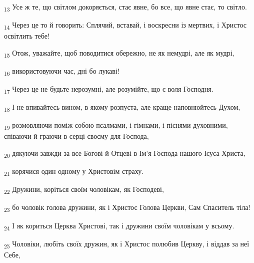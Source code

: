 \begin{tcolorbox}
\textsubscript{13} Усе ж те, що світлом докоряється, стає явне, бо все, що явне стає, то світло.
\end{tcolorbox}
\begin{tcolorbox}
\textsubscript{14} Через це то й говорить: Сплячий, вставай, і воскресни із мертвих, і Христос освітлить тебе!
\end{tcolorbox}
\begin{tcolorbox}
\textsubscript{15} Отож, уважайте, щоб поводитися обережно, не як немудрі, але як мудрі,
\end{tcolorbox}
\begin{tcolorbox}
\textsubscript{16} використовуючи час, дні бо лукаві!
\end{tcolorbox}
\begin{tcolorbox}
\textsubscript{17} Через це не будьте нерозумні, але розумійте, що є воля Господня.
\end{tcolorbox}
\begin{tcolorbox}
\textsubscript{18} І не впивайтесь вином, в якому розпуста, але краще наповнюйтесь Духом,
\end{tcolorbox}
\begin{tcolorbox}
\textsubscript{19} розмовляючи поміж собою псалмами, і гімнами, і піснями духовними, співаючи й граючи в серці своєму для Господа,
\end{tcolorbox}
\begin{tcolorbox}
\textsubscript{20} дякуючи завжди за все Богові й Отцеві в Ім'я Господа нашого Ісуса Христа,
\end{tcolorbox}
\begin{tcolorbox}
\textsubscript{21} корячися один одному у Христовім страху.
\end{tcolorbox}
\begin{tcolorbox}
\textsubscript{22} Дружини, коріться своїм чоловікам, як Господеві,
\end{tcolorbox}
\begin{tcolorbox}
\textsubscript{23} бо чоловік голова дружини, як і Христос Голова Церкви, Сам Спаситель тіла!
\end{tcolorbox}
\begin{tcolorbox}
\textsubscript{24} І як кориться Церква Христові, так і дружини своїм чоловікам у всьому.
\end{tcolorbox}
\begin{tcolorbox}
\textsubscript{25} Чоловіки, любіть своїх дружин, як і Христос полюбив Церкву, і віддав за неї Себе,
\end{tcolorbox}
